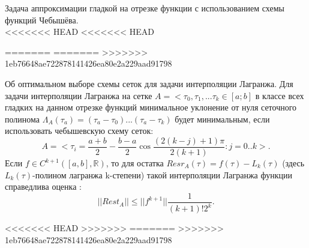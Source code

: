 \documentclass[__main__.tex]{subfiles}
\begin{document}
Задача аппроксимации гладкой на отрезке функции с использованием схемы функций Чебышёва.\\

<<<<<<< HEAD
<<<<<<< HEAD

=======
=======
>>>>>>> 1eb76648ae722878141426ea80e2a229aad91798
\begin{theorem}
	Об оптимальном выборе схемы сеток для задачи интерполяции Лагранжа. Для задачи интерполяции Лагранжа на сетке $A=<\tau_{0},\tau_{1},...\tau_{k}\in[a;b]$ в классе всех гладких на данном отрезке функций минимальное уклонение от нуля сеточного полинома $\Lambda_{A}(\tau_{a})=(\tau_{a}-\tau_{0})...(\tau_{a}-\tau_{k})$ будет минимальным, если использовать чебышевскую схему сеток:
	$$A=<\tau_{i}=\frac{a+b}{2}-\frac{b-a}{2}\cos\frac{(2(k-j)+1)\pi}{2(k+1)}:j=0..k>.$$
	Если $f\in C^{k+1}([a,b],\mathbb{R})$, то для остатка $Resr_{A}(\tau)=f(\tau)-L_{k}(\tau) $  (здесь $L_{k}(\tau)$-полином лагранжа k-степени) такой интерполяции Лагранжа функции справедлива оценка :
	$$||Rest_{A}||\leq||f^{k+1}||\frac{1}{(k+1)!2^{k}}. $$
\end{theorem}
<<<<<<< HEAD
>>>>>>> 
=======
>>>>>>> 1eb76648ae722878141426ea80e2a229aad91798
\end{document}
